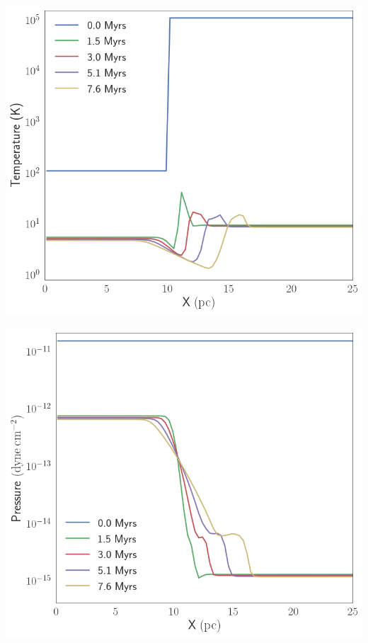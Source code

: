 		\begin{marginfigure}
		\centering
		\includegraphics[width=1\linewidth]{DataImages/SNCoolingTMPprofile}
		\caption{}
		\label{fig:sncoolingtmpprofile}
	\end{marginfigure}
	
	\begin{marginfigure}
		\centering
		\includegraphics[width=1\linewidth]{DataImages/SNCoolingPRSprofile}
		\caption{}
		\label{fig:sncoolingprsprofile}
	\end{marginfigure}
	
